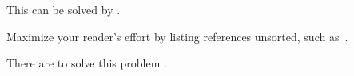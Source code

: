 This can be solved by .

Maximize your reader's effort by listing references
unsorted, such as~\badstyle{[17, 8, 1, 6]}.

There are  
to solve this problem .
